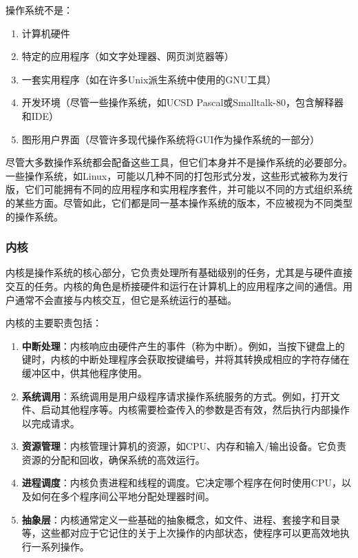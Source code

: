 操作系统不是：

\begin{enumerate}
    \item 计算机硬件
    \item 特定的应用程序（如文字处理器、网页浏览器等）
    \item 一套实用程序（如在许多Unix派生系统中使用的GNU工具）
    \item 开发环境（尽管一些操作系统，如UCSD Pascal或Smalltalk-80，包含解释器和IDE）
    \item 图形用户界面（尽管许多现代操作系统将GUI作为操作系统的一部分）
\end{enumerate}

尽管大多数操作系统都会配备这些工具，但它们本身并不是操作系统的必要部分。一些操作系统，如Linux，可能以几种不同的打包形式分发，这些形式被称为发行版，它们可能拥有不同的应用程序和实用程序套件，并可能以不同的方式组织系统的某些方面。尽管如此，它们都是同一基本操作系统的版本，不应被视为不同类型的操作系统。

\subsubsection{内核}

内核是操作系统的核心部分，它负责处理所有基础级别的任务，尤其是与硬件直接交互的任务。内核的角色是桥接硬件和运行在计算机上的应用程序之间的通信。用户通常不会直接与内核交互，但它是系统运行的基础。

内核的主要职责包括：

\begin{enumerate}
    \item \textbf{中断处理}：内核响应由硬件产生的事件（称为中断）。例如，当按下键盘上的键时，内核的中断处理程序会获取按键编号，并将其转换成相应的字符存储在缓冲区中，供其他程序使用。
    \item \textbf{系统调用}：系统调用是用户级程序请求操作系统服务的方式。例如，打开文件、启动其他程序等。内核需要检查传入的参数是否有效，然后执行内部操作以完成请求。
    \item \textbf{资源管理}：内核管理计算机的资源，如CPU、内存和输入/输出设备。它负责资源的分配和回收，确保系统的高效运行。
    \item \textbf{进程调度}：内核负责进程和线程的调度。它决定哪个程序在何时使用CPU，以及如何在多个程序间公平地分配处理器时间。
    \item \textbf{抽象层}：内核通常定义一些基础的抽象概念，如文件、进程、套接字和目录等，这些都对应于它记住的关于上次操作的内部状态，使程序可以更高效地执行一系列操作。
\end{enumerate}

